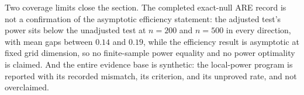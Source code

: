 Two coverage limits close the section. The completed exact-null ARE record is not a confirmation of the asymptotic efficiency statement: the adjusted test's power sits below the unadjusted test at $n=200$ and $n=500$ in every direction, with mean gaps between $0.14$ and $0.19$, while the efficiency result is asymptotic at fixed grid dimension, so no finite-sample power equality and no power optimality is claimed. And the entire evidence base is synthetic: the local-power program is reported with its recorded mismatch, its criterion, and its unproved rate, and not overclaimed.
